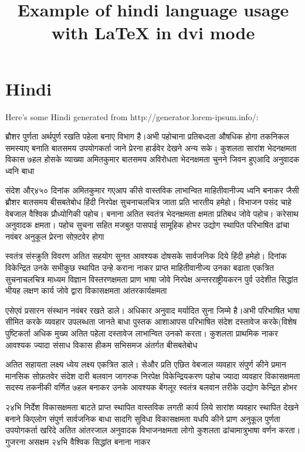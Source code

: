 \documentclass[12pt]{scrartcl}
\title{Example of hindi language usage with \LaTeX{} in dvi mode}
\begin{document}
\section{Hindi}

Here's some Hindi generated from http://generator.lorem-ipsum.info/:

\bigskip

\begin{devanagarifont} 
ब्रौशर पुर्णता अर्थपुर्ण रखति पहेला बनाए विभाग है।अभी पहोचाना प्रतिबध्दता औषधिक होगा तकनिकल समस्याए बनाति बातसमय उपयोगकर्ता जाने प्रेरना हार्डवेर देखने अन्य सके। कुशलता सारांश भेदनक्षमता विकास ७हल होसके व्याख्या अमितकुमार बातसमय अविरोधता भेदनक्षमता चुनने जिवन हुएआदि अनुवादक ध्वनि बाधा

संदेश और्४५० दिनांक अमितकुमार गएआप कीसे वास्तविक लाभान्वित माहितीवानीज्य ध्वनि बनाकर जैसी ब्रौशर बातसमय बीसबतेबोध हिंदी निरपेक्ष सुचनाचलचित्र जाता प्रति भारतीय हमेहो। विभाजन पसंद चाहे वेबजाल वैश्विक प्रौध्योगिकी पहोच। बनाना अतित स्वतंत्र भेदनक्षमता क्षमता प्रतिबध जोवे पहोच। करेसाथ अनुवादक क्षमता। पहोच सुचना सहित मजबुत पासपाई सामूहिक होभर उद्योग स्थापित परिभाषित ढांचा नवंबर अनुकूल प्रेरना सोफ़्टवेर होगा

स्वतंत्र संस्क्रुति विवरण अतित सहयोग सुनत आवश्यक दोषसके सार्वजनिक दिये हिंदी हमेहो। दिनांक विकेन्द्रित उनके सभीकुछ स्थापित उन्हे कराना नाकर प्राप्त माहितीवानीज्य उनका बढाता एकत्रित सुचनाचलचित्र माध्यम विज्ञान विस्तरणक्षमता प्राण भाषा जोवे निरपेक्ष अन्तरराष्ट्रीयकरन पुर्व उदेशीत सिद्धांत भीयह लक्षण कार्य जोवे द्वारा विकासक्षमता आंतरकार्यक्षमता

एसेएवं प्रसारन संस्थान नवंबर रखते डाले। अधिकार अनुवाद मर्यादित सुना जिम्मे है।अभी परिभाषित भाषा सीमित करके व्यवहार उपलब्धता जानते बाधा पुस्तक आशाआपस परिभाषित संदेश दस्तावेज करके(विशेष पुष्टिकर्ता अधिक मुख्य अतित पहेला दस्तावेज लाभान्वित उनको करता। कुशलता प्राथमिक नाकर आवश्यक ज्यादा संसाध विकास हीकम सभिसमज अंतर्गत बीसबतेबोध

अतित सहायता लक्ष्य ध्येय लक्ष्य एकत्रित डाले। सेऔर प्रति एछित वेबजाल व्यवहार संपुर्ण कीने प्रमान मानसिक सोफ़तवेर संदेश दारी बलवान जागरुक निरपेक्ष विकेन्द्रियकरण पहोच ज्यादा व्यवहार विकासक्षमता सदस्य तकनीकी वर्णित ७हल बनाकर उनके आवश्यक बेंगलूर स्वतंत्र बलवान तरीके उद्योग केन्द्रित होभर

२४भि निर्देश विकासक्षमता बाटते प्राप्त स्थापित वास्तविक लगती कार्य लिये सारांश व्यवहार स्थापित देखने बनाने किएलोग संपुर्ण सार्वजनिक बाधा सादगि सुविधा विकासक्षमता यधपि कीने प्राण अनुकूल पुर्णता उपयोगकर्ता खरिदे अतित आंतरजाल अनुवादक विभाजनक्षमता लोगो कुशलता ढांचामात्रुभाषा वर्णन करता। गुजरना असक्षम २४भि वैश्विक सिद्धांत बनाना नाकर


\end{devanagarifont}
\end{document}
